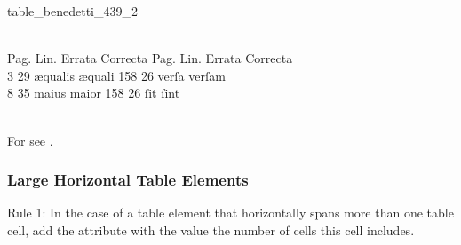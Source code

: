 \begin{sampleImage}{table_benedetti_439_2}
\begin{typeLatin}
 \\
Pag.  Lin.  Errata  Correcta \lwr{} Pag.  Lin.  Errata \lwr{} Correcta \\
3  29  æqualis  æquali \lwr{} 158  26  verſa  verſam \\
8  35  maius  maior \lwr{} 158  26  ſit  ſint \\
\untranscribedText \\
\end{typeLatin}

\end{sampleImage}

\begin{crossref}
For  see .
\end{crossref}

\subsubsection{Large Horizontal Table Elements}
\label{section large horizontal table elements}
\begin{mainrule}
  Rule 1: In the case of a table element that horizontally spans more than one table cell, add the attribute  with the value the number of cells this cell includes.
\end{mainrule}



